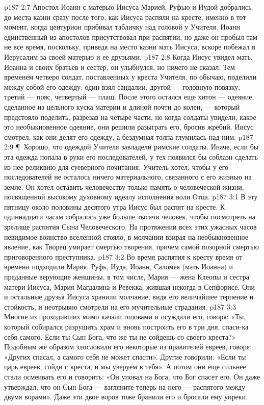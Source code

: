 \vs p187 2:7 Апостол Иоанн с матерью Иисуса Марией, Руфью и Иудой добрались до места казни сразу после того, как Иисуса распяли на кресте, именно в тот момент, когда центурион прибивал табличку над головой у Учителя. Иоанн единственный из апостолов присутствовал при распятии, но даже он пробыл там не все время, поскольку, приведя на место казни мать Иисуса, вскоре побежал в Иерусалим за своей матерью и ее друзьями.
\vs p187 2:8 Когда Иисус увидел мать, Иоанна и своих братьев и сестер, он улыбнулся, но ничего не сказал. Тем временем четверо солдат, поставленных у креста Учителя, по обычаю, поделили между собой его одежду: один взял сандалии, другой --- головную повязку, третий --- пояс, четвертый --- плащ. После этого остался еще хитон --- одеяние, сделанное из цельного куска материи и длиной почти до колен, --- который предстояло поделить, разрезав на четыре части, но когда солдаты увидели, какое это необыкновенное одеяние, они решили разыграть его, бросив жребий. Иисус смотрел, как они делят его одежду, а бездумная толпа глумилась над ним.
\vs p187 2:9 \P\ Хорошо, что одеждой Учителя завладели римские солдаты. Иначе, если бы эта одежда попала в руки его последователей, у тех появился бы соблазн сделать из нее реликвию для суеверного почитания. Учитель хотел, чтобы у его последователей не осталось ничего материального, связанного с его жизнью на земле. Он хотел оставить человечеству только память о человеческой жизни, посвященной высокому духовному идеалу исполнения воли Отца.
\vs p187 3:1 В эту пятницу около половины десятого утра Иисус был распят на кресте. К одиннадцати часам собралось уже больше тысячи человек, чтобы посмотреть на зрелище распятия Сына Человеческого. На протяжении всех этих ужасных часов невидимое воинство вселенной стояло, в молчании взирая на необыкновенное явление, как Творец умирает смертью творения, причем самой позорной смертью приговоренного преступника.
\vs p187 3:2 Во время распятия к кресту время от времени подходили Мария, Руфь, Иуда, Иоанн, Саломея (мать Иоанна) и преданные верующие женщины, в том числе, Мария --- жена Клеопы и сестра матери Иисуса, Мария Магдалина и Ревекка, жившая некогда в Сепфорисе. Они и остальные друзья Иисуса хранили молчание, видя его величайшее терпение и стойкость, и неотрывно смотрели на его мучительные страдания.
\vs p187 3:3 Многие из проходивших мимо качали головами и осуждали его, говоря: «Ты, который собирался разрушить храм и вновь построить его в три дня, спаси\hyp{}ка себя самого. Если ты Сын Бога, что же ты не сойдешь со своего креста?» Подобным же образом злословили его некоторые из правителей евреев, говоря: «Других спасал, а самого себя не может спасти». Другие говорили: «Если ты царь евреев, сойди с креста, и мы уверуем в тебя». А потом они еще сильнее стали осмеивать его и говорить: «Он уповал на Бога, что Бог спасет его. Он даже утверждал, что он Сын Бога --- взгляните теперь на него --- распятого между двумя ворами». Даже эти двое воров тоже бранили его и бросали ему упреки.
